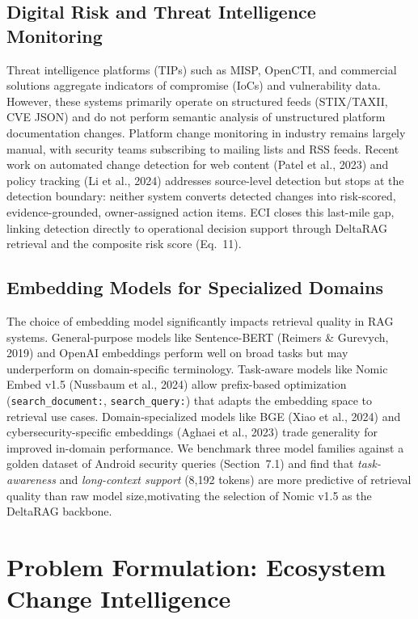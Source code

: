 \documentclass[
]{article}
\begin{document}
\subsection{Digital Risk and Threat Intelligence
Monitoring}\label{digital-risk-and-threat-intelligence-monitoring}

Threat intelligence platforms (TIPs) such as MISP, OpenCTI, and
commercial solutions aggregate indicators of compromise (IoCs) and
vulnerability data. However, these systems primarily operate on
structured feeds (STIX/TAXII, CVE JSON) and do not perform semantic
analysis of unstructured platform documentation changes. Platform change
monitoring in industry remains largely manual, with security teams
subscribing to mailing lists and RSS feeds. Recent work on automated
change detection for web content (Patel et al., 2023) and policy
tracking (Li et al., 2024) addresses source-level detection but stops
at the detection boundary: neither system converts detected changes into
risk-scored, evidence-grounded, owner-assigned action items. ECI closes
this last-mile gap, linking detection directly to operational decision
support through DeltaRAG retrieval and the composite risk score
(Eq.~11).

\subsection{Embedding Models for Specialized
Domains}\label{embedding-models-for-specialized-domains}

The choice of embedding model significantly impacts retrieval quality in
RAG systems. General-purpose models like Sentence-BERT (Reimers \&
Gurevych, 2019) and OpenAI embeddings perform well on broad tasks but
may underperform on domain-specific terminology. Task-aware models like
Nomic Embed v1.5 (Nussbaum et al., 2024) allow prefix-based optimization
(\texttt{search\_document:}, \texttt{search\_query:}) that adapts the embedding
space to retrieval use cases. Domain-specialized models like BGE (Xiao
et al., 2024) and cybersecurity-specific embeddings (Aghaei et al.,
2023) trade generality for improved in-domain performance. We benchmark
three model families against a golden dataset of Android security
queries (Section~7.1) and find that \emph{task-awareness} and
\emph{long-context support} (8,192 tokens) are more predictive of
retrieval quality than raw model size,motivating the selection of
Nomic v1.5 as the DeltaRAG backbone.

\section{Problem Formulation: Ecosystem Change
Intelligence}\label{problem-formulation-ecosystem-change-intelligence}
\end{document}
